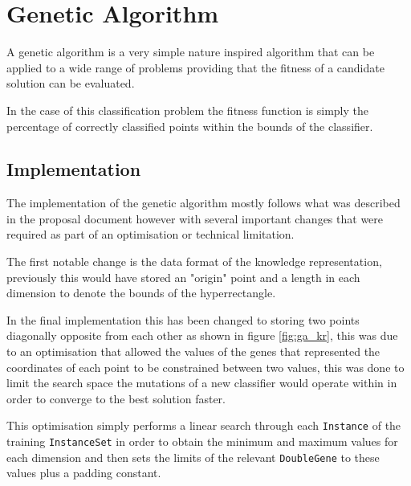 \documentclass[a4paper]{article}
\title{\DOCTITLE}
\author{\DOCAUTHOR}
\date{\DOCDATE}
\begin{document}
\maketitle

\begin{abstract}
  This report will give an overview of the two nature inspired algorithms that
  were implemented to solve the classification problem, how they differ from
  what was outlined in the proposal and a critical evaluation between the
  performance of both in terms of learning time and classification accuracy.
\end{abstract}

\section{Genetic Algorithm}
\label{sec:ga}

A genetic algorithm is a very simple nature inspired algorithm that can be
applied to a wide range of problems providing that the fitness of a candidate
solution can be evaluated.

In the case of this classification problem the fitness function is simply the
percentage of correctly classified points within the bounds of the classifier.

\subsection{Implementation}
\label{sec:ga_implementation}

The implementation of the genetic algorithm mostly follows what was described in
the proposal document however with several important changes that were required
as part of an optimisation or technical limitation.

The first notable change is the data format of the knowledge representation,
previously this would have stored an "origin" point and a length in each
dimension to denote the bounds of the hyperrectangle.

In the final implementation this has been changed to storing two points
diagonally opposite from each other as shown in figure \ref{fig:ga_kr}, this was
due to an optimisation that allowed the values of the genes that represented the
coordinates of each point to be constrained between two values, this was done to
limit the search space the mutations of a new classifier would operate within in
order to converge to the best solution faster.

This optimisation simply performs a linear search through each \texttt{Instance}
of the training \texttt{InstanceSet} in order to obtain the minimum and maximum
values for each dimension and then sets the limits of the relevant
\texttt{DoubleGene} to these values plus a padding constant.
\end{document}
